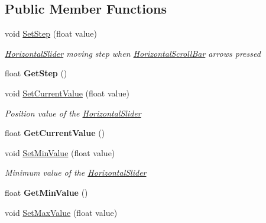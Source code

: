 \subsection*{Public Member Functions}
\begin{DoxyCompactItemize}
\item 
void \mbox{\hyperlink{class_space_v_i_l_1_1_horizontal_slider_a18ffac2f0c6f4f01725b4fd3778dc388}{Set\+Step}} (float value)
\begin{DoxyCompactList}\small\item\em \mbox{\hyperlink{class_space_v_i_l_1_1_horizontal_slider}{Horizontal\+Slider}} moving step when \mbox{\hyperlink{class_space_v_i_l_1_1_horizontal_scroll_bar}{Horizontal\+Scroll\+Bar}} arrows pressed \end{DoxyCompactList}\item 
\mbox{\label{class_space_v_i_l_1_1_horizontal_slider_a42f6f790f49ae171666d30f82908705e}} 
float {\bfseries Get\+Step} ()
\item 
void \mbox{\hyperlink{class_space_v_i_l_1_1_horizontal_slider_a739410ddc3a5391b3ead36097cf2a760}{Set\+Current\+Value}} (float value)
\begin{DoxyCompactList}\small\item\em Position value of the \mbox{\hyperlink{class_space_v_i_l_1_1_horizontal_slider}{Horizontal\+Slider}} \end{DoxyCompactList}\item 
\mbox{\label{class_space_v_i_l_1_1_horizontal_slider_ae9f6753351505d659b8d5ff6c5dff21c}} 
float {\bfseries Get\+Current\+Value} ()
\item 
void \mbox{\hyperlink{class_space_v_i_l_1_1_horizontal_slider_aba8cd3fc86a3b670f03badbdd0a28b8c}{Set\+Min\+Value}} (float value)
\begin{DoxyCompactList}\small\item\em Minimum value of the \mbox{\hyperlink{class_space_v_i_l_1_1_horizontal_slider}{Horizontal\+Slider}} \end{DoxyCompactList}\item 
\mbox{\label{class_space_v_i_l_1_1_horizontal_slider_acaa2423ec23d142c67ebeb26a78b0479}} 
float {\bfseries Get\+Min\+Value} ()
\item 
void \mbox{\hyperlink{class_space_v_i_l_1_1_horizontal_slider_a371d41e7d45c1d027a7d1a94209e4ecb}{Set\+Max\+Value}} (float value)

\end{DoxyCompactItemize}
